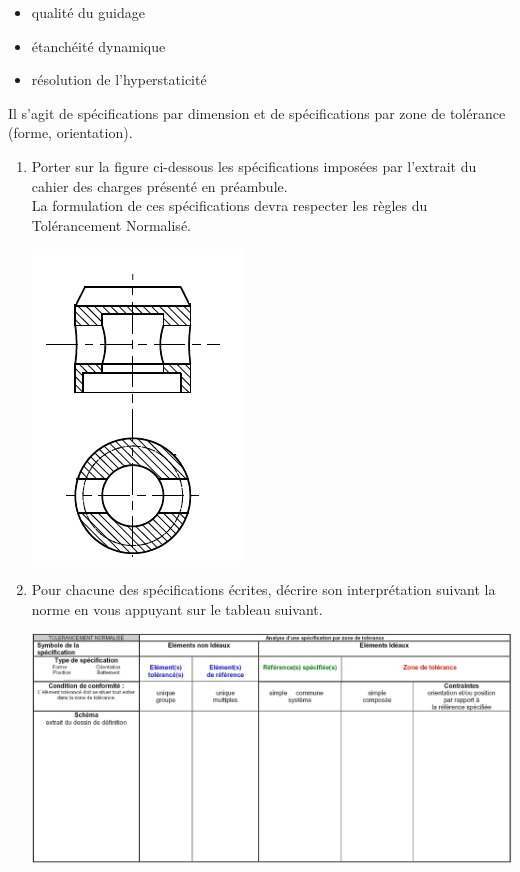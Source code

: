 \begin{itemize}
\item qualité du guidage
\item étanchéité dynamique
\item résolution de l'hyperstaticité
\end{itemize}

Il s'agit de spécifications par dimension et de spécifications par zone de tolérance (forme, orientation).

\begin{enumerate}
\item Porter sur la figure ci-dessous les spécifications imposées par l'extrait du cahier des charges
présenté en préambule.\\
La formulation de ces spécifications devra respecter les règles du Tolérancement Normalisé.

\begin{center}
\includegraphics[scale=0.8]{png/piston.png}
\end{center}

\item Pour chacune des spécifications écrites, décrire son interprétation suivant la norme en vous appuyant sur le tableau suivant.

\begin{center}
\includegraphics[scale=0.55]{png/doc_rep.png}
\end{center}
\end{enumerate}

